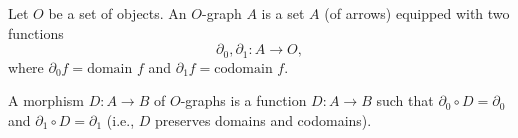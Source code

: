 Let $O$ be a set of objects. An $O$-graph $A$ is a set $A$ (of arrows) equipped with two functions
$$\partial_0, \partial_1 : A \to O,$$
where $\partial_0 f = \text{domain } f$ and $\partial_1 f = \text{codomain } f$.

A morphism $D : A \to B$ of $O$-graphs is a function $D : A \to B$ such that $\partial_0 \circ D = \partial_0$ and $\partial_1 \circ D = \partial_1$ (i.e., $D$ preserves domains and codomains).
